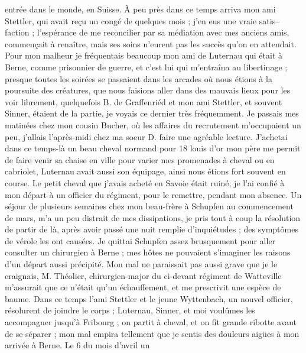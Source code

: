 \documentclass[12pt]{article}
\begin{document}
 entrée dans le monde, en Suisse. À peu près dans ce
temps arriva mon ami Stettler, qui avait reçu un congé de quelques mois ; j’en eus une vraie
satis–faction ; l’espérance de me reconcilier par sa médiation avec mes anciens amis, commençait à
renaître, mais ses soins n’eurent pas les succès qu’on en attendait. Pour mon malheur je fréquentais
beaucoup mon ami de Luternau qui était à Berne, comme prisonnier de guerre, et c’est lui qui
m’entraîna au libertinage ; presque toutes les soirées se passaient dans les arcades où nous étions
à la poursuite des créatures, que nous faisions aller dans des mauvais lieux pour les voir
librement, quelquefois B. de Graffenriéd et mon ami Stettler, et souvent Sinner, étaient de la
partie, je voyais ce dernier très fréquemment. Je passais mes matinées chez mon cousin Bucher, où
les affaires du recrutement m’occupaient un peu, j’allais l’après-midi chez ma soeur D. faire une
agréable lecture. J’achetai dans ce temps-là un beau cheval normand pour 18 louis d’or mon père me
permit de faire venir sa chaise en ville pour varier mes promenades à cheval ou en cabriolet,
Luternau avait aussi son équipage, ainsi nous étions fort souvent en course. Le petit cheval que
j’avais acheté en Savoie était ruiné, je l’ai confié à mon départ à un officier du régiment, pour le
remettre, pendant mon absence. Un séjour de plusieurs semaines chez mon beau-frère à Schupfen au
commencement de mars, m’a un peu distrait de mes dissipations, je pris tout à coup la résolution de
partir de là, après avoir passé une nuit remplie d’inquiétudes ; des symptômes de vérole les ont
causées. Je quittai Schupfen assez brusquement pour aller consulter un chirurgien à Berne ; mes
hôtes ne pouvaient s’imaginer les raisons d’un départ aussi précipité. Mon mal ne paraissait pas
aussi grave que je le craignais, M. Théolier, chirurgien-major du ci-devant régiment de Watteville
m’assurait que ce n’était qu’un échauffement, et me prescrivit une espèce de baume. Dans ce temps
l’ami Stettler et le jeune Wyttenbach, un nouvel officier, résolurent de joindre le corps ;
Luternau, Sinner, et moi voulûmes les accompagner jusqu’à Fribourg ; on partit à cheval, et on fit
grande ribotte avant de se séparer ; mon mal empira tellement que je sentis des douleurs aigües à
mon arrivée à Berne. Le 6 du mois d’avril un
\end{document}
